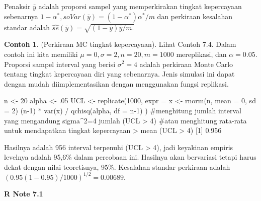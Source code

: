\documentclass[a4paper,12pt]{article}
\theoremstyle{definition}
\newtheorem{example}{Contoh}[section]
\begin{document}
Penaksir $\bar{y}$ adalah proporsi sampel yang memperkirakan tingkat kepercayaan sebenarnya $1-\alpha^{*}, so Var(\bar{y})=(1-\alpha ^{*})\alpha ^{*}/m$ dan perkiraan kesalahan standar adalah $\widehat{se}(\bar{y})= \sqrt{(1-\overline{y})\bar{y}/m.}$

\begin{example}
     (Perkiraan MC tingkat kepercayaan). Lihat Contoh 7.4. Dalam contoh ini kita memiliki $\mu = 0, \sigma  = 2, n= 20, m = 1000 $ mereplikasi, dan $\alpha =0.05.$ Proporsi sampel interval yang berisi $\sigma ^{2}=4$ adalah perkiraan Monte Carlo tentang tingkat kepercayaan diri yang sebenarnya. Jenis simulasi ini dapat dengan mudah diimplementasikan dengan menggunakan fungsi replikasi.
\end{example}

\begin{spverbatim}
    n <- 20
    alpha <- .05
    UCL <- replicate(1000, expr = {
        x <- rnorm(n, mean = 0, sd = 2)
        (n-1) * var(x) / qchisq(alpha, df = n-1)
    } )
    #menghitung jumlah interval yang mengandung sigma^2=4 jumlah (UCL > 4)
    #atau menghitung rata-rata untuk mendapatkan tingkat kepercayaan
    > mean (UCL > 4)
    [1] 0.956
\end{spverbatim}

Hasilnya adalah 956 interval terpenuhi (UCL > 4), jadi keyakinan empiris
levelnya adalah 95,6\% dalam percobaan ini. Hasilnya akan bervariasi tetapi harus dekat dengan nilai teoretisnya, 95\%. Kesalahan standar perkiraan adalah $(0.95(1-0.95)/1000)^{1/2}=0.00689.$

\textbf{R Note 7.1}
\end{document}

